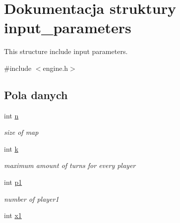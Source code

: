 \hypertarget{structinput__parameters}{\section{Dokumentacja struktury input\-\_\-parameters}
\label{structinput__parameters}
}


This structure include input parameters.  




{\ttfamily \#include $<$engine.\-h$>$}

\subsection*{Pola danych}
\begin{DoxyCompactItemize}
\item 
\hypertarget{structinput__parameters_ab3a0882ef67c5fb19683671720fcc7a6}{int \hyperlink{structinput__parameters_ab3a0882ef67c5fb19683671720fcc7a6}{n}}\label{structinput__parameters_ab3a0882ef67c5fb19683671720fcc7a6}

\begin{DoxyCompactList}\small\item\em size of map \end{DoxyCompactList}\item 
\hypertarget{structinput__parameters_abb9b1fbe51332fcecfb5a5cd205f047f}{int \hyperlink{structinput__parameters_abb9b1fbe51332fcecfb5a5cd205f047f}{k}}\label{structinput__parameters_abb9b1fbe51332fcecfb5a5cd205f047f}

\begin{DoxyCompactList}\small\item\em maximum amount of turns for every player \end{DoxyCompactList}\item 
\hypertarget{structinput__parameters_a19e44a03729441c732e953a3ca01bc3f}{int \hyperlink{structinput__parameters_a19e44a03729441c732e953a3ca01bc3f}{p1}}\label{structinput__parameters_a19e44a03729441c732e953a3ca01bc3f}

\begin{DoxyCompactList}\small\item\em number of player1 \end{DoxyCompactList}\item 
\hypertarget{structinput__parameters_a5846cf94e253e32101934a964a7c74e1}{int \hyperlink{structinput__parameters_a5846cf94e253e32101934a964a7c74e1}{x1}}\label{structinput__parameters_a5846cf94e253e32101934a964a7c74e1}


\end{DoxyCompactItemize}

